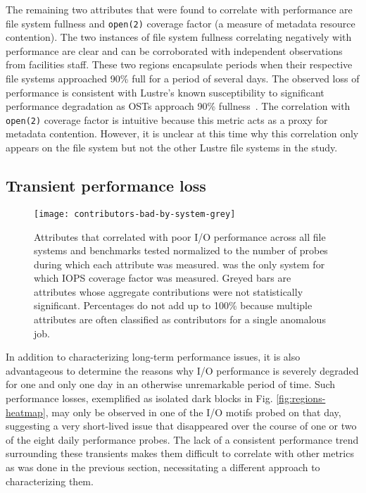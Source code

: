 The remaining two attributes that were found to correlate with performance
are file system fullness and \texttt{open(2)} coverage factor (a
measure of metadata resource contention).  The two instances of file
system fullness correlating negatively with performance are clear
and can be corroborated with independent observations from facilities
staff.  These two regions encapsulate periods when their respective
file systems approached 90\% full for a period of several days.
The observed loss of performance is consistent with Lustre's known
susceptibility to significant performance degradation as OSTs approach
90\% fullness~\cite{oral2014best,Lockwood2017}.  The correlation with
\texttt{open(2)} coverage factor is intuitive because this metric acts as a
proxy for metadata contention.  However, it is unclear at this time why this
correlation only appears on the \edison \scratchtwo file system but not the
other Lustre file systems in the study.

\subsection{Transient performance loss} \label{sec:results/shortterm}


\begin{figure}

    \centering
    \texttt{[image: contributors-bad-by-system-grey]}
    \vspace{-.35in}
    \caption{Attributes that correlated with poor I/O performance across all file systems and benchmarks tested normalized to the number of probes during which each attribute was measured.
    \mira was the only system for which IOPS coverage factor was measured.
    Greyed bars are attributes whose aggregate contributions were not statistically significant.
    Percentages do not add up to 100\% because multiple attributes are often classified as contributors for a single anomalous job.
    }
    \label{fig:contributors-bad-by-system}
\end{figure}

In addition to characterizing long-term performance issues, it is also advantageous to determine the reasons why I/O performance is severely degraded for one and only one day in an otherwise unremarkable period of time.
Such performance losses, exemplified as isolated dark blocks in Fig. \ref{fig:regions-heatmap}, may only be observed in one of the I/O motifs probed on that day, suggesting a very short-lived issue that disappeared over the course of one or two of the eight daily performance probes.
The lack of a consistent performance trend surrounding these transients makes them difficult to correlate with other metrics as was done in the previous section, necessitating a different approach to characterizing them.

